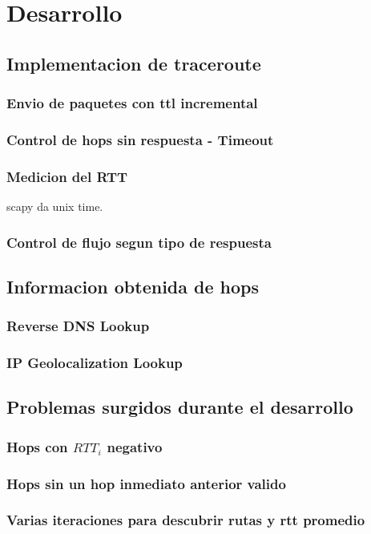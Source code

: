 \section{Desarrollo}
\subsection{Implementacion de traceroute}
\subsubsection{Envio de paquetes con ttl incremental}
\subsubsection{Control de hops sin respuesta - Timeout}
\subsubsection{Medicion del RTT}
scapy da unix time.
\subsubsection{Control de flujo segun tipo de respuesta}

\subsection{Informacion obtenida de hops}
\subsubsection{Reverse DNS Lookup}
\subsubsection{IP Geolocalization Lookup}

\subsection{Problemas surgidos durante el desarrollo}
\subsubsection{Hops con $RTT_i$ negativo}
\subsubsection{Hops sin un hop inmediato anterior valido}
\subsubsection{Varias iteraciones para descubrir rutas y rtt promedio}
